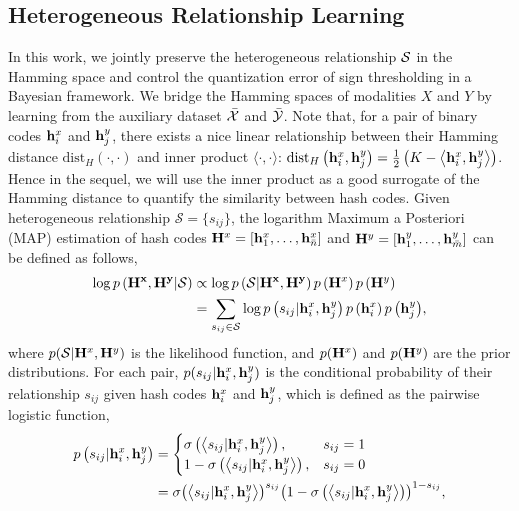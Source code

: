 \documentclass{article}
\begin{document}
\subsection{Heterogeneous Relationship Learning}
In this work, we jointly preserve the heterogeneous relationship ${\cal S}$ in the Hamming space and control the quantization error of sign thresholding in a Bayesian framework. We bridge the Hamming spaces of modalities $X$ and $Y$ by learning from the auxiliary dataset ${\bar{\cal X}}$ and ${\bar{\cal Y}}$. Note that, for a pair of binary codes ${\bf h}_i^x$ and ${\bf h}_j^y$, there exists a nice linear relationship between their Hamming distance $\mathrm{dist}_H(\cdot,\cdot)$ and inner product $\langle \cdot,\cdot \rangle$: ${\textrm{dis}}{{\text{t}}_H}\left( {{{\bf{h}}_i^x},{{\bf{h}}_j^y}} \right) = \frac{1}{2}\left( {K - \left\langle {{{\bf{h}}_i^x},{{\bf{h}}_j^y}} \right\rangle } \right)$. Hence in the sequel, we will use the inner product as a good surrogate of the Hamming distance to quantify the similarity between hash codes. Given heterogeneous relationship $\mathcal{S} = \{s_{ij}\}$, the logarithm Maximum a Posteriori (MAP) estimation of hash codes ${\bf H}^x = [{\bf h}_1^x,\ldots,{\bf h}_{\bar n}^x]$ and ${\bf H}^y = [{\bf h}_1^y,\ldots,{\bf h}_{\bar m}^y]$ can be defined as follows,
\begin{equation}\label{eqn:MAP}
	\begin{aligned}
  	\log p\left( {{\bf{H}^x, \bf{H}^y}|\mathcal{S}} \right) &\propto \log p\left( {\mathcal{S}|{\bf{H}^x, \bf{H}^y}} \right) p\left( {{{\bf{H}}^x}} \right)p\left( {{{\bf{H}}^y}} \right) \\
    &= \sum\limits_{{s_{ij}} \in \mathcal{S}} {\log p\left( {{s_{ij}}|{{\bf{h}}_i^x},{{\bf{h}}_j^y}} \right)p\left( {{{\bf{h}}_i^x}} \right)p\left( {{{\bf{h}}_j^y}} \right)} , \\
	\end{aligned}
\end{equation}
where  $p({\cal S}|{{\bf H}^x, {\bf H}^y})$ is the likelihood function, and $p({{\bf H}}^x)$ and $p({{\bf H}^y})$ are the prior distributions. For each pair, $p(s_{ij}|{\bf h}_i^x,{\bf h}_j^y)$ is the conditional probability of their relationship $s_{ij}$ given hash codes ${\bf h}_i^x$ and ${\bf h}_j^y$, which is defined as the pairwise logistic function,
 \begin{equation}
 \label{eqn:CDF}
	\begin{aligned}
	p\left( {{s_{ij}}|{{\bf h}_i^x},{{\bf h}_j^y}} \right) &= 
		\begin{cases}
			\sigma \left( {\left\langle {{s_{ij}}|{\bf h}_i^x,{\bf h}_j^y} \right\rangle } \right), & {s_{ij}} = 1 \\
			1 - \sigma \left( {\left\langle {{s_{ij}}|{\bf h}_i^x,{\bf h}_j^y} \right\rangle } \right), & {s_{ij}} = 0 \\
		\end{cases} \\
		& = \sigma{\left( {\left\langle {{s_{ij}}|{\bf h}_i^x,{\bf h}_j^y} \right\rangle } \right)^{{s_{ij}}}}{\left( {1 - \sigma \left( {\left\langle {{s_{ij}}|{\bf h}_i^x,{\bf h}_j^y} \right\rangle } \right)} \right)^{1 - {s_{ij}}}}, \\
	\end{aligned}
\end{equation}
\end{document}
